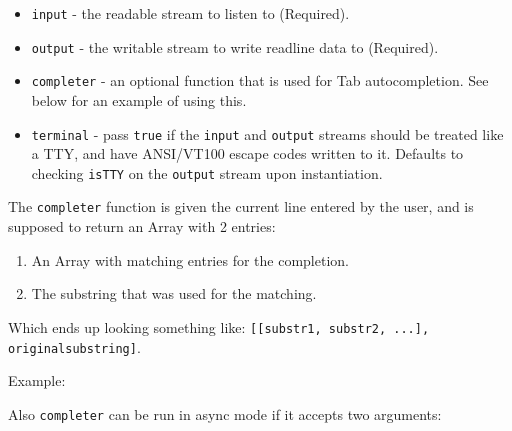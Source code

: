\begin{itemize}
\item
  \texttt{input} - the readable stream to listen to (Required).
\item
  \texttt{output} - the writable stream to write readline data to
  (Required).
\item
  \texttt{completer} - an optional function that is used for Tab
  autocompletion. See below for an example of using this.
\item
  \texttt{terminal} - pass \texttt{true} if the \texttt{input} and
  \texttt{output} streams should be treated like a TTY, and have
  ANSI/VT100 escape codes written to it. Defaults to checking
  \texttt{isTTY} on the \texttt{output} stream upon instantiation.
\end{itemize}

The \texttt{completer} function is given the current line entered by the
user, and is supposed to return an Array with 2 entries:

\begin{enumerate}
\def\labelenumi{\arabic{enumi}.}
\item
  An Array with matching entries for the completion.
\item
  The substring that was used for the matching.
\end{enumerate}

Which ends up looking something like:
\texttt{{[}{[}substr1, substr2, ...{]}, originalsubstring{]}}.

Example:

\begin{Shaded}
\begin{Highlighting}[]
 
   \NormalTok{(}\NormalTok{)}
   \NormalTok{(}  \NormalTok{\})}
   \NormalTok{[} \NormalTok{? hits : completions, line]}
\NormalTok{\}}
\end{Highlighting}
\end{Shaded}

Also \texttt{completer} can be run in async mode if it accepts two
arguments:

